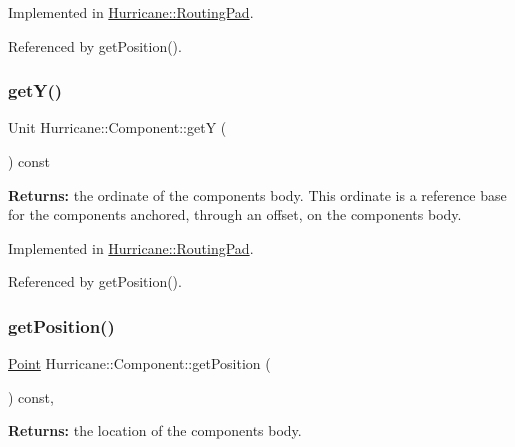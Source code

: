 Implemented in \mbox{\hyperlink{classHurricane_1_1RoutingPad_a5c9c00c648bd0d24e1a8b0876ab442df}{Hurricane\+::\+Routing\+Pad}}.



Referenced by get\+Position().

\mbox{\label{classHurricane_1_1Component_a727da3f127c3a7a0a09468219f98c3e6}} 
\subsubsection{\texorpdfstring{get\+Y()}{getY()}}
{\footnotesize\ttfamily Unit Hurricane\+::\+Component\+::getY (\begin{DoxyParamCaption}{ }\end{DoxyParamCaption}) const\hspace{0.3cm}{\ttfamily [pure virtual]}}

{\bfseries Returns\+:} the ordinate of the component\textquotesingle{}s body. This ordinate is a reference base for the components anchored, through an offset, on the component\textquotesingle{}s body. 

Implemented in \mbox{\hyperlink{classHurricane_1_1RoutingPad_aede4c04a7f893b1e5478b164b6eaae2d}{Hurricane\+::\+Routing\+Pad}}.



Referenced by get\+Position().

\mbox{\label{classHurricane_1_1Component_aa4e9a47c89fe701670ca34355195d519}} 
\subsubsection{\texorpdfstring{get\+Position()}{getPosition()}}
{\footnotesize\ttfamily \mbox{\hyperlink{classHurricane_1_1Point}{Point}} Hurricane\+::\+Component\+::get\+Position (\begin{DoxyParamCaption}{ }\end{DoxyParamCaption}) const\hspace{0.3cm}{\ttfamily [inline]}, {\ttfamily [virtual]}}

{\bfseries Returns\+:} the location of the component\textquotesingle{}s body.


